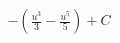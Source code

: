 \documentclass[preview]{standalone}
\begin{document}
\begin{align*}
- \left( \frac{u^3}{3} - \frac{u^5}{5} \right) + C
\end{align*}
\end{document}
